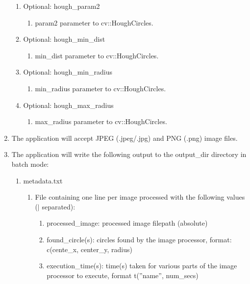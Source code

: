 \documentclass[10pt, onecolumn, draftclsnofoot, letterpaper, compsoc]{IEEEtran}
\begin{document}
\begin{enumerate}
\begin{enumerate}
            \item Optional: hough\_param2
		 		\begin{enumerate}
		 			\item param2 parameter to cv::HoughCircles.
		 		\end{enumerate}

            \item Optional: hough\_min\_dist
		 		\begin{enumerate}
		 			\item min\_dist parameter to cv::HoughCircles.
		 		\end{enumerate}

            \item Optional: hough\_min\_radius
		 		\begin{enumerate}
		 			\item min\_radius parameter to cv::HoughCircles.
		 		\end{enumerate}

            \item Optional: hough\_max\_radius
		 		\begin{enumerate}
		 			\item max\_radius parameter to cv::HoughCircles.
		 		\end{enumerate}
		 \end{enumerate}

		 \item The application will accept JPEG (.jpeg/.jpg) and PNG (.png)
		 image files.

		 \item The application will write the following output to the
		 output\_dir directory in batch mode:
		 \begin{enumerate}
		 	\item metadata.txt
		 	\begin{enumerate}
		 		\item File containing one line per image processed with the
		 		following values ($\vert$  separated):
		 		\begin{enumerate}
                    \item processed\_image: processed image filepath (absolute)

                    \item found\_circle(s): circles found by the image processor, format:
                        c(cente\_x, center\_y, radius)

                    \item execution\_time(s): time(s) taken for various parts of the image
                    processor to execute, format t(''name'', num\_secs)


\end{enumerate}
\end{enumerate}
\end{enumerate}
\end{enumerate}
\end{document}

